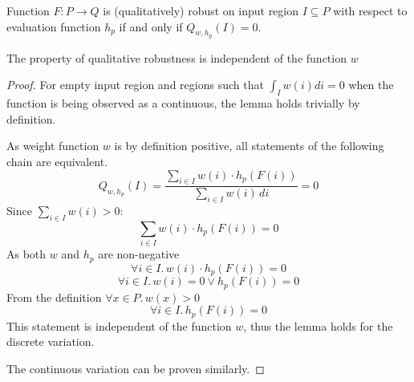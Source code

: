 \begin{definition}
    Function $F : P\to Q$ is (qualitatively) robust on input region $I\subseteq P$
    with respect to evaluation function $h_p$
    if and only if $Q_{w, h_p}(I) = 0$.
\end{definition}

\begin{lemma}{The property of qualitative robustness is independent of the function $w$}%
    \label{lemma:robustness_independence_of_weight}
    \begin{proof}
        For empty input region and regions such that $\int_I w(i) di = 0$
        when the function is being observed as a continuous,
        the lemma holds trivially by definition.

        As weight function $w$ is by definition positive,
        all statements of the following chain are equivalent.
        \begin{equation*}
            Q_{w, h_p}(I) = \frac{\sum_{i\in I} w(i)\cdot h_p(F(i))}{\sum_{i\in I} w(i) \, di} = 0
        \end{equation*}
        Since $\sum_{i\in I} w(i) > 0$:
        \begin{equation*}
            \sum_{i\in I} w(i)\cdot h_p(F(i)) = 0
        \end{equation*}
        As both $w$ and $h_p$ are non-negative
        \begin{equation*}
            \forall i\in I. \, w(i)\cdot h_p(F(i)) = 0
        \end{equation*}
        \begin{equation*}
            \forall i\in I. \, w(i) = 0 \vee h_p(F(i)) = 0
        \end{equation*}
        From the definition $\forall x\in P.\, w(x) > 0$
        \begin{equation*}
            \forall i\in I. \, h_p(F(i)) = 0
        \end{equation*}
        This statement is independent of the function $w$,
        thus the lemma holds for the discrete variation.

        The continuous variation can be proven similarly.
    \end{proof}
\end{lemma}

